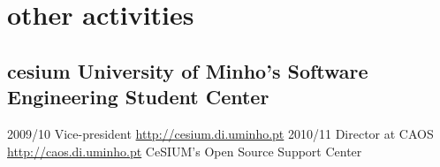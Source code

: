 \documentclass[a4paper]{friggeri-cv}
\begin{document}


\section{other activities}
\subsection{cesium {\normalfont\small University of Minho's Software Engineering Student Center}}{}
\begin{entrylist}
  \entry
    {2009/10}
    {Vice-president}
    {\href{http://cesium.di.uminho.pt}{http://cesium.di.uminho.pt}}
    {\vspace{-.8cm}}
    {}
  \entry
    {2010/11}
    {Director at CAOS}
    {\href{http://caos.di.uminho.pt}{http://caos.di.uminho.pt}}
    {CeSIUM's Open Source Support Center}
    {\vspace{-.5cm}}
\end{entrylist}
\end{document}
